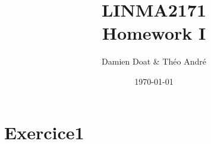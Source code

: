 \documentclass{article}
\title{\textbf{LINMA2171} \\ Homework I}
\author{Damien Doat \& Théo André }
\date{\today}
\begin{document}
\maketitle

\hrulefill
\vspace{1cm}

\section{Exercice1}
\end{document}
